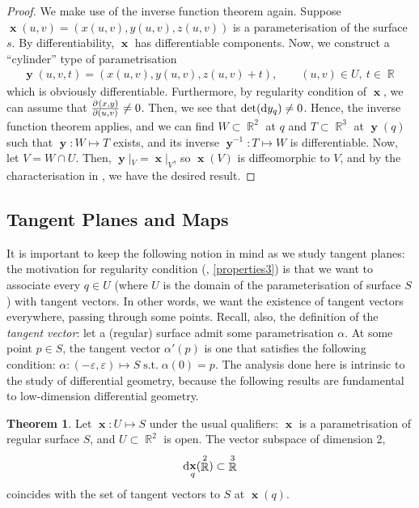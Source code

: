 \documentclass{amsart} %
\renewcommand{\epsilon}{\varepsilon}
\theoremstyle{mytheoremstyle}
\theoremstyle{definition}
\newtheorem{theorem}[definition]{Theorem}
\numberwithin{equation}{section}
\DeclareMathOperator{\R}{\mathbb{R}}
\DeclareMathOperator{\1}{\mathbbm{1}}
\DeclareMathOperator{\suchthat}{\text{ s.t. }}
\DeclareMathOperator{\D}{\dif}
\DeclareMathOperator{\x}{\mathbf{x}}
\DeclareMathOperator{\y}{\mathbf{y}}
\renewcommand{\epsilon}{\varepsilon}
\renewcommand{\epsilon}{\varepsilon}
\begin{document}
\begin{proof}
	We make use of the inverse function theorem again. Suppose $\x(u,v) = (x(u,v),y(u,v),z(u,v))$ is a parameterisation of the surface $s$. By differentiability, $\x$ has differentiable components. Now, we construct a ``cylinder'' type of parametrisation
	\begin{align*}
	\y(u,v,t) = (x(u,v),y(u,v),z(u,v) + t ), \qquad (u,v) \in U, \: t \in \R
	\end{align*}
	which is obviously differentiable. Furthermore, by regularity condition of $\x$, we can assume that $\pd{(x,y)}{(u,v)} \neq 0$. Then, we see that $\det (\D y_{q}) \neq 0$. Hence, the inverse function theorem applies, and we can find $W \subset \R^2$ at $q$ and $T \subset \R^3$ at $\y(q)$ such that $\y : W \mapsto T$ exists, and its inverse $\y^{-1} : T \mapsto W$ is differentiable. Now, let $V = W \cap U$. Then, $\y|_{V} = \x|_{V}$, so $\x(V)$ is diffeomorphic to $V$, and by the characterisation in , we have the desired result.
\end{proof}


\subsection{Tangent Planes and Maps}
It is important to keep the following notion in mind as we study tangent planes: the motivation for regularity condition (, \eqref{properties3}) is that we want to associate every $q \in U$ (where $U$ is the domain of the parameterisation of surface $S$) with tangent vectors. In other words, we want the existence of tangent vectors everywhere, passing through some points. Recall, also, the definition of the \textit{tangent vector}: let a (regular) surface admit some parametrisation $\alpha$. At some point $p \in S$, the tangent vector $\alpha'(p)$ is one that satisfies the following condition: $\alpha: (-\epsilon,\epsilon) \mapsto S \suchthat \alpha(0) = p$. The analysis done here is intrinsic to the study of differential geometry, because the following results are fundamental to low-dimension differential geometry.

\begin{theorem}
	\label{thmdifferentialofsubspaceistangentplane}
	Let $\x: U \mapsto S$ under the usual qualifiers: $\x$ is a parametrisation of regular surface $S$, and $U \subset \R^2$ is open. The vector subspace of dimension 2,
	\begin{align*}
	\D \x_q (\R^2) \subset \R^3
	\end{align*}
	coincides with the set of tangent vectors to $S$ at $\x(q)$.
\end{theorem}
\end{document}
